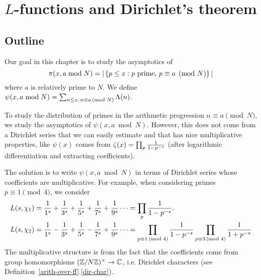\chapter{$L$-functions and Dirichlet's theorem}
\section{Outline}
Our goal in this chapter is to study the asymptotics of 
\[\pi(x,a\bmod N)
=|\left\{{p\le x}:{p\text{ prime, }p\equiv a\pmod N}\right\}|
\]
where $a$ is relatively prime to $N$. We define $\psi(x,a\bmod N)=\sum_{n\le x,\,n\equiv a\,(\text{mod }N)}\Lambda(n)$.

To study the distribution of primes in the arithmetic progression $n\equiv a\pmod N$, %
we study the asymptotics of $\psi(x,a\bmod N)$. However, this does not come from a Dirichlet series that we can easily estimate and that has nice multiplicative properties, like $\psi(x)$ comes from $\zeta(x)=\prod_p\frac{1}{1-p^{-s}}$ (after logarithmic differentiation and extracting coefficients).

The solution is to write $\psi(x,a\bmod N)$ in terms of Dirichlet series whose coefficients are multiplicative. For example, when considering primes $p\equiv 1\pmod 4$, 
we consider
\begin{align*}
L(s,\chi_1)&=\frac{1}{1^s}+\frac{1}{3^s}+\frac{1}{5^s}+\frac{1}{7^s}+\frac{1}{9^s}\cdots=\prod_{p}\frac{1}{1-p^{-s}}.\\
L(s,\chi_2)&=\frac{1}{1^s}-\frac{1}{3^s}+\frac{1}{5^s}-\frac{1}{7^s}+\frac{1}{9^s}\cdots=\prod_{p\equiv 1\,(\text{mod }4)}\frac{1}{1-p^{-s}}\prod_{p\equiv 3\,(\text{mod }4)}\frac{1}{1+p^{-s}}
\end{align*}
The multiplicative structure is from the fact that the coefficients come from group homomorphisms $(\mathbb{Z}/N\mathbb{Z})^{\times}\to \mathbb{C}$, i.e. Dirichlet characters (see Definition~\ref{arith-over-ff}.\ref{dir-char}).

